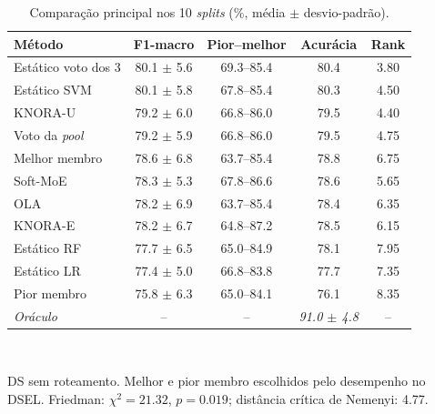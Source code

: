 \begin{table}[H]
\centering
\caption{Comparação principal nos 10 \textit{splits} (\%, média $\pm$ desvio-padrão).}
\label{tab:main}
\footnotesize
\begin{tabular}{lcccc}
\toprule
\textbf{Método} & \textbf{F1-macro} & \textbf{Pior--melhor} & \textbf{Acurácia} & \textbf{Rank} \\
\midrule
Estático voto dos 3 & 80.1 $\pm$ 5.6 & 69.3--85.4 & 80.4 & 3.80 \\
Estático SVM & 80.1 $\pm$ 5.8 & 67.8--85.4 & 80.3 & 4.50 \\
KNORA-U & 79.2 $\pm$ 6.0 & 66.8--86.0 & 79.5 & 4.40 \\
Voto da \textit{pool} & 79.2 $\pm$ 5.9 & 66.8--86.0 & 79.5 & 4.75 \\
Melhor membro & 78.6 $\pm$ 6.8 & 63.7--85.4 & 78.8 & 6.75 \\
Soft-MoE & 78.3 $\pm$ 5.3 & 67.8--86.6 & 78.6 & 5.65 \\
OLA & 78.2 $\pm$ 6.9 & 63.7--85.4 & 78.4 & 6.35 \\
KNORA-E & 78.2 $\pm$ 6.7 & 64.8--87.2 & 78.5 & 6.15 \\
Estático RF & 77.7 $\pm$ 6.5 & 65.0--84.9 & 78.1 & 7.95 \\
Estático LR & 77.4 $\pm$ 5.0 & 66.8--83.8 & 77.7 & 7.35 \\
Pior membro & 75.8 $\pm$ 6.3 & 65.0--84.1 & 76.1 & 8.35 \\
\midrule
\textit{Oráculo} & -- & -- & \textit{91.0 $\pm$ 4.8} & -- \\
\bottomrule
\end{tabular}
\\[1ex]
\parbox{0.95\linewidth}{\scriptsize DS sem roteamento. Melhor e pior membro escolhidos pelo desempenho no DSEL. Friedman: $\chi^2 = 21.32$, $p = 0.019$; distância crítica de Nemenyi: 4.77.}
\end{table}
